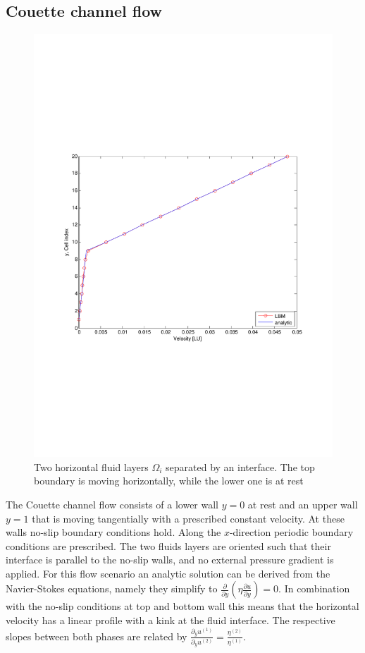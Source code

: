 \documentclass[final,leqno,onefignum,onetabnum]{siamltexmm}
\begin{document}
\subsection{Couette channel flow}
\begin{figure}[h!]
	\flushright
	\hfill\includegraphics[trim = 0mm 8cm 0mm 8cm, clip, width=.8\textwidth, natwidth=595,natheight=842]{couette1.pdf}\hspace*{\fill}
  \caption{Two horizontal fluid layers $\Omega_i$ separated by an interface. The top boundary is moving horizontally, while the lower one is at rest}
	\label{couette1}
\end{figure}
The Couette channel flow consists of a lower wall $y=0$ at rest and an upper wall $y=1$ that is moving tangentially with a prescribed constant velocity. At these walls no-slip boundary conditions hold. Along the $x$-direction periodic boundary conditions are prescribed. The two fluids layers are oriented such that their interface is parallel to the no-slip walls, and no external pressure gradient is applied.
For this flow scenario an analytic solution can be derived from the Navier-Stokes equations, namely they simplify to $\frac{\partial }{\partial y}\left( \eta\frac{\partial u}{\partial y}\right) =0$. In combination with the no-slip conditions at top and bottom wall this means that the horizontal velocity has a linear profile with a kink at the fluid interface. The respective slopes between both phases are related by $\frac{\partial_y u^{(1)}}{\partial_y u^{(2)}} = \frac{\eta^{(2)}}{\eta^{(1)}}$.
\end{document}
